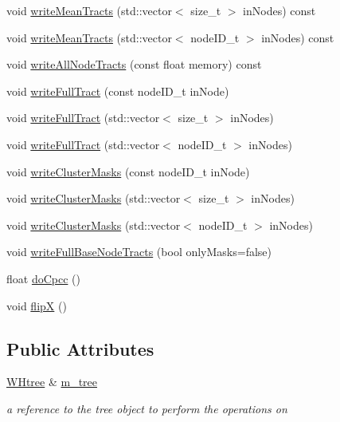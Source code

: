 \begin{DoxyCompactItemize}
\item 
void \hyperlink{classtreeManager_a7695e56e39eee5bec49b34e05125d750}{write\-Mean\-Tracts} (std\-::vector$<$ size\-\_\-t $>$ in\-Nodes) const 
\item 
void \hyperlink{classtreeManager_aaf110438d49dd61b5d92eb4321e1f47e}{write\-Mean\-Tracts} (std\-::vector$<$ node\-I\-D\-\_\-t $>$ in\-Nodes) const 
\item 
void \hyperlink{classtreeManager_a9efa0b878448f7492a6ff77d76020e75}{write\-All\-Node\-Tracts} (const float memory) const 
\item 
void \hyperlink{classtreeManager_aad3ca010348201c64c211ecbf80518a3}{write\-Full\-Tract} (const node\-I\-D\-\_\-t in\-Node)
\item 
void \hyperlink{classtreeManager_a4c74c29da7994f632de9e11699a8ca38}{write\-Full\-Tract} (std\-::vector$<$ size\-\_\-t $>$ in\-Nodes)
\item 
void \hyperlink{classtreeManager_a1d9df2c97b4bd88c9ab5dca298e4aef8}{write\-Full\-Tract} (std\-::vector$<$ node\-I\-D\-\_\-t $>$ in\-Nodes)
\item 
void \hyperlink{classtreeManager_a5cf031b775db12593cbf078846319040}{write\-Cluster\-Masks} (const node\-I\-D\-\_\-t in\-Node)
\item 
void \hyperlink{classtreeManager_af04c46177ccbe52ea0937023ef74416c}{write\-Cluster\-Masks} (std\-::vector$<$ size\-\_\-t $>$ in\-Nodes)
\item 
void \hyperlink{classtreeManager_a28d22e5769f1165755dcb6798bb08480}{write\-Cluster\-Masks} (std\-::vector$<$ node\-I\-D\-\_\-t $>$ in\-Nodes)
\item 
void \hyperlink{classtreeManager_a80aa64daa9d841bc51f5894daef852cd}{write\-Full\-Base\-Node\-Tracts} (bool only\-Masks=false)
\item 
float \hyperlink{classtreeManager_acaff7e11b3f14d2558e1939bdf341e50}{do\-Cpcc} ()
\item 
void \hyperlink{classtreeManager_aba120f5d98c3187ecf3ef24f80931468}{flip\-X} ()
\end{DoxyCompactItemize}
\subsection*{\-Public \-Attributes}
\begin{DoxyCompactItemize}
\item 
\hypertarget{classtreeManager_a1420ed75b372cea746cf3ffc45072293}{\hyperlink{classWHtree}{\-W\-Htree} \& \hyperlink{classtreeManager_a1420ed75b372cea746cf3ffc45072293}{m\-\_\-tree}}\label{classtreeManager_a1420ed75b372cea746cf3ffc45072293}

\begin{DoxyCompactList}\small\item\em a reference to the tree object to perform the operations on \end{DoxyCompactList}\end{DoxyCompactItemize}


